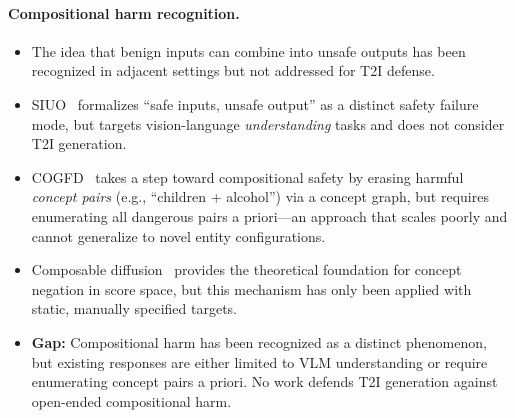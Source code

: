 \documentclass{article}
\begin{document}
\paragraph{Compositional harm recognition.}
\begin{itemize}[leftmargin=*,itemsep=2pt]
\item The idea that benign inputs can combine into unsafe outputs has been recognized in adjacent settings but not addressed for T2I defense.

\item SIUO~\cite{siuo_naacl25} formalizes ``safe inputs, unsafe output'' as a distinct safety failure mode, but targets vision-language \emph{understanding} tasks and does not consider T2I generation.

\item COGFD~\cite{cogfd_iclr25} takes a step toward compositional safety by erasing harmful \emph{concept pairs} (e.g., ``children + alcohol'') via a concept graph, but requires enumerating all dangerous pairs a priori---an approach that scales poorly and cannot generalize to novel entity configurations.

\item Composable diffusion~\cite{composable_eccv22} provides the theoretical foundation for concept negation in score space, but this mechanism has only been applied with static, manually specified targets.

\item \textbf{Gap:} Compositional harm has been recognized as a distinct phenomenon, but existing responses are either limited to VLM understanding or require enumerating concept pairs a priori. No work defends T2I generation against open-ended compositional harm.
\end{itemize}
\end{document}
